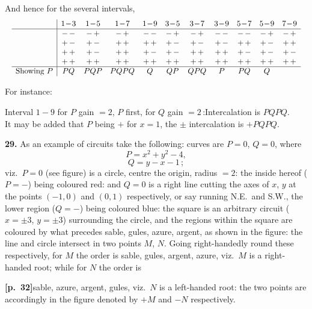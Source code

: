 \documentclass[11pt,a4paper]{article}
\begin{document}
And hence for the several intervals,
\[
\resizebox{\textwidth}{!}{$\displaystyle
\begin{array}{l|cccccccccc}
            & 1\!-\!3 & 1\!-\!5 & 1\!-\!7 & 1\!-\!9 & 3\!-\!5 & 3\!-\!7 & 3\!-\!9 & 5\!-\!7 & 5\!-\!9 & 7\!-\!9 \\\hline
            & -\,- & -\,+ & -\,+ & -\,- & -\,+ & -\,+ & -\,- & -\,- & -\,+ & -\,+ \\
            & +\,- & +\,- & +\,+ & +\,+ & +\,- & +\,- & +\,- & +\,+ & +\,- & +\,+ \\
            & +\,+ & +\,- & +\,+ & +\,- & +\,- & +\,+ & +\,+ & +\,- & +\,- & +\,- \\
            & +\,+ & +\,+ & +\,+ & +\,+ & +\,+ & +\,+ & +\,+ & +\,+ & +\,+ & +\,+ \\\hline
\text{Showing } P & PQ & PQP & PQPQ & Q & QP & QPQ & P & PQ & Q
\end{array}$}
\]

For instance:

Interval $1-9$ for $P$ gain $=2$, $P$ first, for $Q$ gain $=2$\,:\quad Intercalation is $PQPQ$.\\
It may be added that $P$ being $+$ for $x=1$, the $\pm$ intercalation is $+PQPQ$.

\medskip

\noindent\textbf{29.} As an example of circuits take the following: curves are $P=0$, $Q=0$, where
\[
P = x^{2} + y^{2} - 4,
\]
\[
Q = y - x - 1\,;
\]
viz.\ $P=0$ (see figure) is a circle, centre the origin, radius $=2$: the inside hereof ($P=-$) being coloured red: and $Q=0$ is a right line cutting the axes of $x$, $y$ at the points $(-1, 0)$ and $(0, 1)$ respectively, or say running N.E.\ and S.W., the lower region ($Q=-$) being coloured blue: the square is an arbitrary circuit ($x=\pm 3$, $y=\pm 3$) surrounding the circle, and the regions within the square are coloured by what precedes sable, gules, azure, argent, as shown in the figure: the line and circle intersect in two points $M$, $N$. Going right-handedly round these respectively, for $M$ the order is sable, gules, argent, azure, viz.\ $M$ is a right-handed root; while for $N$ the order is

\bigskip

\noindent\textbf{[p.~32]}\quad sable, azure, argent, gules, viz.\ $N$ is a left-handed root: the two points are accordingly in the figure denoted by $+M$ and $-N$ respectively.

\medskip
\end{document}
